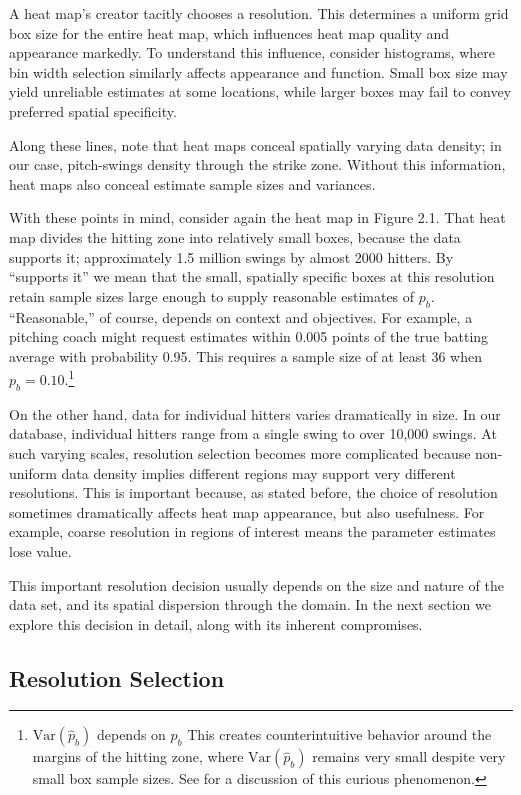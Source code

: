 A heat map's creator tacitly chooses a resolution. This determines a uniform grid box size for the entire heat map, which influences heat map quality and appearance markedly. To understand this influence, consider histograms, where bin width selection similarly affects appearance and function. Small box size may yield unreliable estimates at some locations, while larger boxes may fail to convey preferred spatial specificity. 

Along these lines, note that heat maps conceal spatially varying data density; in our case, pitch-swings density through the strike zone. Without this information, heat maps also conceal estimate sample sizes and variances.  

With these points in mind, consider again the heat map in Figure 2.1. That heat map divides the hitting zone into relatively small boxes, because the data supports it; approximately 1.5 million swings by almost 2000 hitters. By ``supports it'' we mean that the small, spatially specific boxes at this resolution retain sample sizes large enough to supply reasonable estimates of $p_{b}$. ``Reasonable,'' of course, depends on context and objectives. For example, a pitching coach might request estimates within 0.005 points of the true batting average with probability 0.95. This requires a sample size of at least 36 when $p_{b} = 0.10$.\footnote{$\text{Var}(\hat{p}_{b})$ depends on $p_{b}$ This creates counterintuitive behavior around the margins of the hitting zone, where $\text{Var}(\hat{p}_{b})$ remains very small despite very small box sample sizes. See \cite{Dixon2005} for a discussion of this curious phenomenon.}

On the other hand, data for individual hitters varies dramatically in size. In our database, individual hitters range from a single swing to over 10,000 swings. At such varying scales, resolution selection becomes more complicated because non-uniform data density implies different regions may support very different resolutions. This is important because, as stated before, the choice of resolution sometimes dramatically affects heat map appearance, but also usefulness. For example, coarse resolution in regions of interest means the parameter estimates lose value. 

This important resolution decision usually depends on the size and nature of the data set, and its spatial dispersion through the domain. In the next section we explore this decision in detail, along with its inherent compromises.

\subsection{Resolution Selection}

